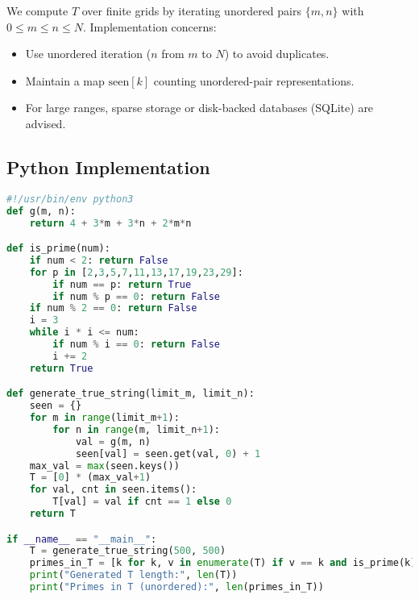 \documentclass[12pt]{article}
\theoremstyle{definition}
\theoremstyle{plain}
\begin{document}
We compute \(T\) over finite grids by iterating unordered pairs \(\{m,n\}\) with \(0 \leq m \leq n \leq N\). Implementation concerns:
\begin{itemize}
  \item Use unordered iteration (\(n\) from \(m\) to \(N\)) to avoid duplicates.
  \item Maintain a map \(\text{seen}[k]\) counting unordered-pair representations.
  \item For large ranges, sparse storage or disk-backed databases (SQLite) are advised.
\end{itemize}

\subsection{Python Implementation}
\begin{lstlisting}[language=Python]
#!/usr/bin/env python3
def g(m, n):
    return 4 + 3*m + 3*n + 2*m*n

def is_prime(num):
    if num < 2: return False
    for p in [2,3,5,7,11,13,17,19,23,29]:
        if num == p: return True
        if num % p == 0: return False
    if num % 2 == 0: return False
    i = 3
    while i * i <= num:
        if num % i == 0: return False
        i += 2
    return True

def generate_true_string(limit_m, limit_n):
    seen = {}
    for m in range(limit_m+1):
        for n in range(m, limit_n+1):
            val = g(m, n)
            seen[val] = seen.get(val, 0) + 1
    max_val = max(seen.keys())
    T = [0] * (max_val+1)
    for val, cnt in seen.items():
        T[val] = val if cnt == 1 else 0
    return T

if __name__ == "__main__":
    T = generate_true_string(500, 500)
    primes_in_T = [k for k, v in enumerate(T) if v == k and is_prime(k)]
    print("Generated T length:", len(T))
    print("Primes in T (unordered):", len(primes_in_T))
\end{lstlisting}
\end{document}
